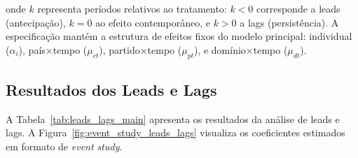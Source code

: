 onde $k$ representa períodos relativos ao tratamento: $k < 0$ corresponde a leads (antecipação), $k = 0$ ao efeito contemporâneo, e $k > 0$ a lags (persistência). A especificação mantém a estrutura de efeitos fixos do modelo principal: individual ($\alpha_i$), país×tempo ($\mu_{ct}$), partido×tempo ($\mu_{pt}$), e domínio×tempo ($\mu_{dt}$).

\subsection{Resultados dos Leads e Lags}

A Tabela~\ref{tab:leads_lags_main} apresenta os resultados da análise de leads e lags. A Figura~\ref{fig:event_study_leads_lags} visualiza os coeficientes estimados em formato de \emph{event study}.

